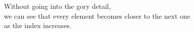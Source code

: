 \documentclass[preview]{standalone}
\begin{document}
\begin{center}
Without going into the gory detail, \\we can see that every element becomes closer to the next one \\as the index increases.
\end{center}
\end{document}
